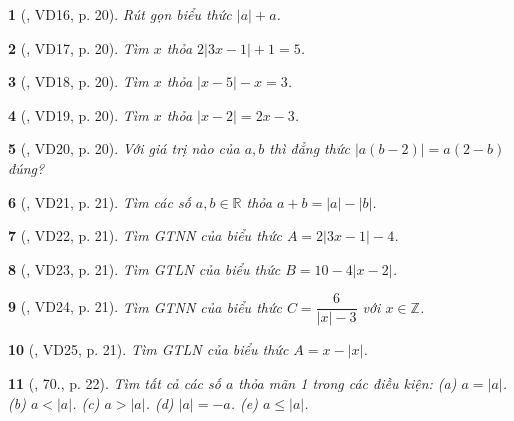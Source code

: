 \documentclass{article}
\newtheorem{baitoan}{}
\begin{document}
\begin{baitoan}[\cite{Binh_Toan_7_tap_1}, VD16, p. 20]
	Rút gọn biểu thức $|a| + a$.
\end{baitoan}

\begin{baitoan}[\cite{Binh_Toan_7_tap_1}, VD17, p. 20]
	Tìm $x$ thỏa $2|3x - 1| + 1 = 5$.
\end{baitoan}

\begin{baitoan}[\cite{Binh_Toan_7_tap_1}, VD18, p. 20]
	Tìm $x$ thỏa $|x - 5| - x = 3$.
\end{baitoan}

\begin{baitoan}[\cite{Binh_Toan_7_tap_1}, VD19, p. 20]
	Tìm $x$ thỏa $|x - 2| = 2x - 3$.
\end{baitoan}

\begin{baitoan}[\cite{Binh_Toan_7_tap_1}, VD20, p. 20]
	Với giá trị nào của $a,b$ thì đẳng thức $|a(b - 2)| = a(2 - b)$ đúng?
\end{baitoan}

\begin{baitoan}[\cite{Binh_Toan_7_tap_1}, VD21, p. 21]
	Tìm các số $a,b\in\mathbb{R}$ thỏa $a + b = |a| - |b|$.
\end{baitoan}

\begin{baitoan}[\cite{Binh_Toan_7_tap_1}, VD22, p. 21]
	Tìm {\rm GTNN} của biểu thức $A = 2|3x - 1| - 4$.
\end{baitoan}

\begin{baitoan}[\cite{Binh_Toan_7_tap_1}, VD23, p. 21]
	Tìm {\rm GTLN} của biểu thức $B = 10 - 4|x - 2|$.
\end{baitoan}

\begin{baitoan}[\cite{Binh_Toan_7_tap_1}, VD24, p. 21]
	Tìm {\rm GTNN} của biểu thức $C = \dfrac{6}{|x| - 3}$ với $x\in\mathbb{Z}$.
\end{baitoan}

\begin{baitoan}[\cite{Binh_Toan_7_tap_1}, VD25, p. 21]
	Tìm {\rm GTLN} của biểu thức $A = x - |x|$.
\end{baitoan}

\begin{baitoan}[\cite{Binh_Toan_7_tap_1}, 70., p. 22]
	Tìm tất cả các số $a$ thỏa mãn 1 trong các điều kiện: (a) $a = |a|$. (b) $a < |a|$. (c) $a > |a|$. (d) $|a| = -a$. (e) $a\le|a|$.	
\end{baitoan}
\end{document}
